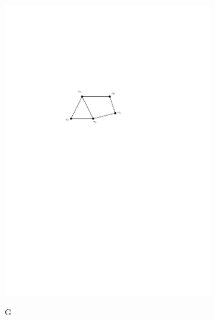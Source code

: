 \begin{figure}[htb]
\centering
\begin{subfigure}{0.42\textwidth}
\centering
\includegraphics[width = \textwidth]{../media/iso1.pdf} \\
\caption{G}
\label{fig:iso1}
\end{subfigure}
\hspace{2cm}
\begin{subfigure}{0.30\textwidth}
\centering

\end{subfigure}
\end{figure}
